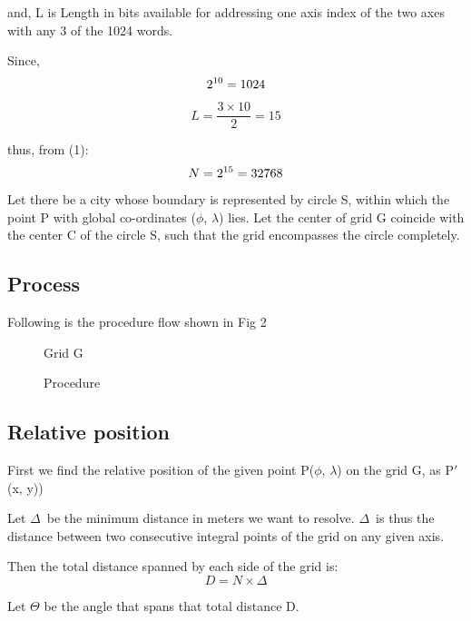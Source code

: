 \documentclass[conference]{IEEEtran}
\begin{document}
and, L is Length in bits available for addressing one axis index of the two axes with any 3 of the 1024 words.

Since, \begin{equation}2\textsuperscript{10}  = 1024\end{equation}

\begin{equation}L = \frac {3 \times 10} {2} = 15 \end{equation}

thus, from (1):
\begin{equation}N = 2\textsuperscript{15} = 32768 \end{equation}

Let there be a city whose boundary is represented by circle S, within which the point P with global co-ordinates ($\phi$, $\lambda$) lies. Let the center of grid G coincide with the center C of the circle S, such that the grid encompasses the circle completely.

\subsection{Process} Following is the procedure flow shown in Fig 2

\begin{figure}[H]
\centerline{}
\caption{Grid G}
\label{Grid}
\end{figure}

\begin{figure}[H]
\centerline{}
\caption{Procedure}
\label{Procedure}
\end{figure}

\subsection{Relative position} First we find the relative position of the given point P($\phi$, $\lambda$) on the grid G, as P$'$(x, y))

Let $\Delta$\ be the minimum distance in meters we want to resolve.
$\Delta$\ is thus the distance between two consecutive integral points of the grid on any given axis.

Then the total distance spanned by each side of the grid is:
\begin{equation}D = N \times \Delta\end{equation}

Let $\Theta$ be the angle that spans that total distance D.
\end{document}
